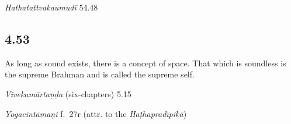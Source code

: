 \begin{ekdosis}

\begin{testimonia}[hp04_052*1]
\emph{Hathatattvakaumudī} 54.48
\begin{versinnote}
\end{versinnote}

\end{testimonia}


\subsection*{4.53}
\begin{translation}[hp04_053]
As long as sound exists, there is a concept of space. That which is soundless is the supreme Brahman and is called the supreme self.
\end{translation}

\begin{sources}[hp04_053]
\emph{Vivekamārtaṇḍa} (six-chapters) 5.15 %
\begin{versinnote}
\end{versinnote}
\end{sources}

\begin{testimonia}[hp04_053]
\emph{Yogacintāmaṇi} f.~27r (attr. to the \emph{Haṭhapradīpikā})
\begin{versinnote}
\end{versinnote}


\end{testimonia}
\end{ekdosis}
